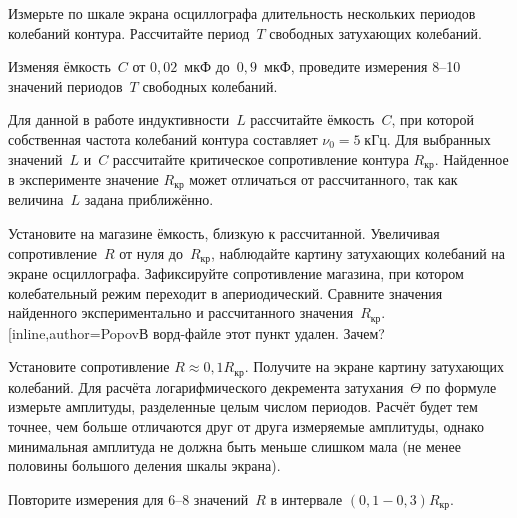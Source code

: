 \begin{lab:task}
\item Измерьте по шкале экрана осциллографа длительность нескольких периодов
колебаний контура. Рассчитайте период~$T$ свободных затухающих 
колебаний.

\item \label{325-p2} Изменяя ёмкость~$C$ от $0,02$~мкФ до~$0,9$~мкФ, проведите измерения 
8--10 значений периодов~$T$ свободных колебаний.



\item \label{325-p8} Для данной в работе индуктивности~$L$ рассчитайте ёмкость~$C$, при которой
собственная частота колебаний контура составляет $\nu_0=5\;кГц$.
Для выбранных значений~$L$ и~$C$ рассчитайте критическое сопротивление
контура $R_\text{кр}$. Найденное в эксперименте значение $R_{\text{кр}}$
может отличаться от рассчитанного, так как величина~$L$ задана приближённо.


\item Установите на магазине ёмкость, близкую к рассчитанной. Увеличивая
сопротивление~$R$ от нуля до~$R_\text{кр}$, наблюдайте картину затухающих
колебаний на экране осциллографа. Зафиксируйте сопротивление магазина, при
котором колебательный режим переходит в апериодический. Сравните значения
найденного экспериментально и рассчитанного значения~$R_\text{кр}$.
\todo[inline,author=Popov{В ворд-файле этот пункт удален. Зачем?}

\item Установите сопротивление $R \approx 0,1 R_\text{кр}$. Получите
на экране картину затухающих колебаний. Для расчёта логарифмического декремента
затухания~$\Theta$ по формуле~ измерьте амплитуды,
разделенные целым числом периодов. Расчёт будет тем точнее, чем больше
отличаются друг от друга измеряемые амплитуды, однако минимальная амплитуда не должна быть
меньше слишком мала (не менее половины большого деления шкалы экрана).

\item \label{325-p9} Повторите измерения для 6--8 значений~$R$ 
в интервале $(0,1-0,3)R_\text{кр}$.



\end{lab:task}
